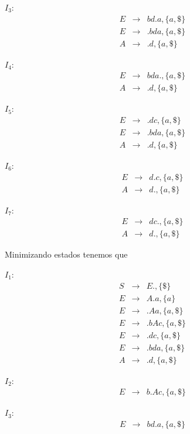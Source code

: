 $I_3$:
\begin{eqnarray*}
    E &\rightarrow& bd.a, \{a, \$\}\\
    E &\rightarrow& .bda, \{a, \$\}\\
    A &\rightarrow& .d, \{a, \$\}
\end{eqnarray*}

$I_4$:
\begin{eqnarray*}
        E &\rightarrow& bda., \{a, \$\}\\
        A &\rightarrow& .d, \{a, \$\}
\end{eqnarray*}

$I_5$:
\begin{eqnarray*}
        E &\rightarrow& .dc, \{a, \$\}\\
        E &\rightarrow& .bda, \{a, \$\}\\
        A &\rightarrow& .d, \{a, \$\}
\end{eqnarray*}

$I_6$:
\begin{eqnarray*}
        E &\rightarrow& d.c, \{a, \$\}\\
        A &\rightarrow& d., \{a, \$\}
\end{eqnarray*}

$I_7$:
\begin{eqnarray*}
        E &\rightarrow& dc., \{a, \$\}\\
        A &\rightarrow& d., \{a, \$\}
\end{eqnarray*}

Minimizando estados tenemos que

$I_1$:
\begin{eqnarray*}
        S &\rightarrow& E., \{\$\}\\
        E &\rightarrow& A.a, \{a\}\\
        E &\rightarrow& .Aa, \{a, \$\}\\
        E &\rightarrow& .bAc, \{a, \$\}\\
        E &\rightarrow& .dc, \{a, \$\}\\
        E &\rightarrow& .bda, \{a, \$\}\\
        A &\rightarrow& .d, \{a, \$\}
\end{eqnarray*}

$I_2$:
\begin{eqnarray*}
    E &\rightarrow&  b.Ac, \{a, \$\}
\end{eqnarray*}

$I_3$:
\begin{eqnarray*}
    E &\rightarrow& bd.a, \{a, \$\}\\
\end{eqnarray*}

